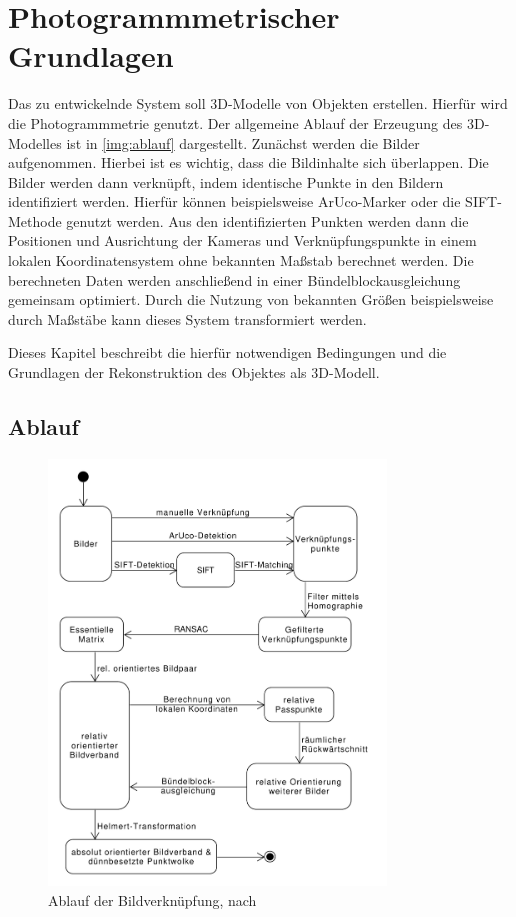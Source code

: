\documentclass[./00PhotoBox.tex]{subfiles}
\begin{document}
\chapter{Photogrammmetrischer Grundlagen}
\label{c:photogrammmetrie}
Das zu entwickelnde System soll 3D-Modelle von Objekten erstellen. Hierfür wird die Photogrammmetrie genutzt.
Der allgemeine Ablauf der Erzeugung des 3D-Modelles ist in \autoref{img:ablauf} dargestellt. Zunächst werden die Bilder aufgenommen. Hierbei ist es wichtig, dass die Bildinhalte sich überlappen. Die Bilder werden dann verknüpft, indem identische Punkte in den Bildern identifiziert werden. Hierfür können beispielsweise ArUco-Marker oder die SIFT-Methode genutzt werden. Aus den identifizierten Punkten werden dann die Positionen und Ausrichtung der Kameras und Verknüpfungspunkte in einem lokalen Koordinatensystem ohne bekannten Maßstab berechnet werden. Die berechneten Daten werden anschließend in einer Bündelblockausgleichung gemeinsam optimiert. Durch die Nutzung von bekannten Größen beispielsweise durch Maßstäbe kann dieses System transformiert werden.

Dieses Kapitel beschreibt die hierfür notwendigen Bedingungen und die Grundlagen der Rekonstruktion des Objektes als 3D-Modell.

\section{Ablauf}
\label{s:ablauf}


\begin{figure}
    \centering
    \includegraphics[width=0.8\textwidth]{./img/Ablauf.pdf}
    \centering
    \caption{Ablauf der Bildverknüpfung, nach \citealt[S. 492]{luhmann}} %
    \label{img:ablauf} %
\end{figure}
\end{document}
